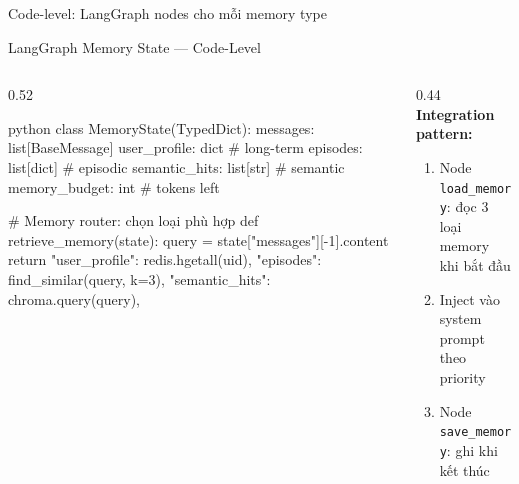 \documentclass[aspectratio=169]{beamer}
\begin{document}

  {Code-level: LangGraph nodes cho mỗi memory type}

\begin{frame}[fragile]{LangGraph Memory State --- Code-Level}
  \begin{columns}[T, onlytextwidth]
    \begin{column}{0.52\textwidth}
      \begin{codeframe}{python}
class MemoryState(TypedDict):
    messages: list[BaseMessage]
    user_profile: dict        # long-term
    episodes: list[dict]      # episodic
    semantic_hits: list[str]  # semantic
    memory_budget: int        # tokens left

# Memory router: chọn loại phù hợp
def retrieve_memory(state):
    query = state["messages"][-1].content
    return {
        "user_profile": redis.hgetall(uid),
        "episodes": find_similar(query, k=3),
        "semantic_hits": chroma.query(query),
    }
      \end{codeframe}
    \end{column}
    \begin{column}{0.44\textwidth}
      \textbf{Integration pattern:}
      \begin{enumerate}
        \item Node \texttt{load\_memory}: đọc 3 loại memory khi bắt đầu
        \item Inject vào system prompt theo priority
        \item Node \texttt{save\_memory}: ghi khi kết thúc
      \end{enumerate}
      \vspace{4pt}
    \end{column}
  \end{columns}
\end{frame}
\end{document}
